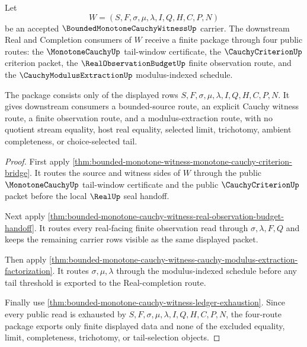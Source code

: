 \begin{theorem}
\label{thm:bounded-monotone-cauchy-witness-downstream-unblock-package}
Let
$$
W=(S,F,\sigma,\mu,\lambda,I,Q,H,C,P,N)
$$
be an accepted $\BoundedMonotoneCauchyWitnessUp$ carrier. The downstream Real and Completion consumers of $W$ receive a finite package through four public routes: the $\MonotoneCauchyUp$ tail-window certificate, the $\CauchyCriterionUp$ criterion packet, the $\RealObservationBudgetUp$ finite observation route, and the $\CauchyModulusExtractionUp$ modulus-indexed schedule.

The package consists only of the displayed rows $S,F,\sigma,\mu,\lambda,I,Q,H,C,P,N$. It gives downstream consumers a bounded-source route, an explicit Cauchy witness route, a finite observation route, and a modulus-extraction route, with no quotient stream equality, host real equality, selected limit, trichotomy, ambient completeness, or choice-selected tail.
\end{theorem}
\begin{proof}
First apply \autoref{thm:bounded-monotone-witness-monotone-cauchy-criterion-bridge}. It routes the source and witness sides of $W$ through the public $\MonotoneCauchyUp$ tail-window certificate and the public $\CauchyCriterionUp$ packet before the local $\RealUp$ seal handoff.

Next apply \autoref{thm:bounded-monotone-cauchy-witness-real-observation-budget-handoff}. It routes every real-facing finite observation read through $\sigma,\lambda,F,Q$ and keeps the remaining carrier rows visible as the same displayed packet.

Then apply \autoref{thm:bounded-monotone-cauchy-witness-cauchy-modulus-extraction-factorization}. It routes $\sigma,\mu,\lambda$ through the modulus-indexed schedule before any tail threshold is exported to the Real-completion route.

Finally use \autoref{thm:bounded-monotone-cauchy-witness-ledger-exhaustion}. Since every public read is exhausted by $S,F,\sigma,\mu,\lambda,I,Q,H,C,P,N$, the four-route package exports only finite displayed data and none of the excluded equality, limit, completeness, trichotomy, or tail-selection objects.
\end{proof}

